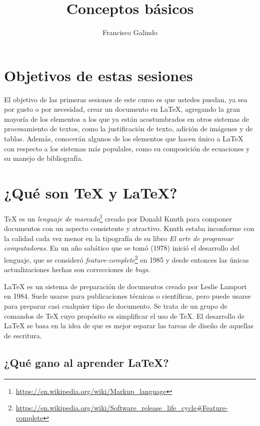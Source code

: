 \documentclass[12pt]{article}
\author{Francisco Galindo}
\title{Conceptos básicos}
\begin{document}
\maketitle
\tableofcontents

\section{Objetivos de estas sesiones}

El objetivo de las primeras sesiones de este curso es que ustedes puedan, ya
sea por gusto o por necesidad, crear un documento en \LaTeX{}, agregando la
gran mayoría de los elementos a los que ya están acostumbrados en otros
sistemas de procesamiento de textos, como la justificación de texto, adición de
imágenes y de tablas. Además, conocerán algunos de los elementos que hacen
único a \LaTeX{} con respecto a los sistemas más populales, como su composición
de ecuaciones y su manejo de bibliografía.

\section{¿Qué son \TeX{} y \LaTeX?}

\TeX{} es un \emph{lenguaje de
marcado}\footnote{\url{https://en.wikipedia.org/wiki/Markup_language}} creado
por Donald Knuth para componer documentos con un aspecto consistente y
atractivo. Knuth estaba inconforme con la calidad cada vez menor en la
tipografía de su libro \textit{El arte de programar computadoras}. En un año
sabático que se tomó (1978) inició el desarrollo del lenguaje, que se consideró
\textit{feature-complete}\footnote{\url{https://en.wikipedia.org/wiki/Software_release_life_cycle\#Feature-complete}}
en 1985 y desde entonces las únicas actualizaciones hechas son correcciones de
\textit{bugs}.

\LaTeX{} es un sistema de preparación de documentos \cite{latex:1} creado por
Leslie Lamport en 1984. Suele usarse para publicaciones técnicas o científicas,
pero puede usarse para preparar casi cualquier tipo de documento. Se trata de
un grupo de comandos de \TeX{} cuyo propósito es simplificar el uso de \TeX{}.
El desarrollo de \LaTeX{} se basa en la idea de que es mejor separar las tareas
de diseño de aquellas de escritura.

\subsection{¿Qué gano al aprender \LaTeX?}
\end{document}
